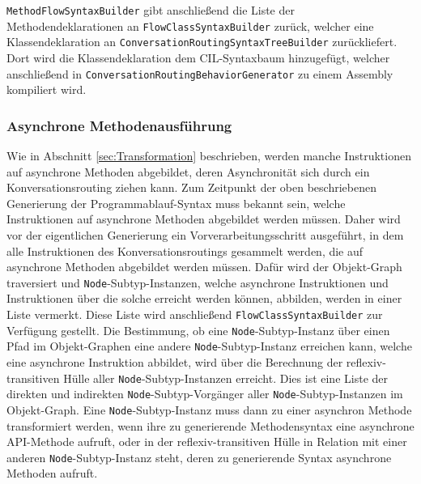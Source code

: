\newline
\texttt{Meth\-od\-Flow\-Syn\-tax\-Buil\-der} gibt anschließend die Liste der Methodendeklarationen an \texttt{Flow\-Class\-Syn\-tax\-Buil\-der} zurück, welcher eine Klassendeklaration an \texttt{Con\-ver\-sa\-tion\-Rou\-ting\-Syn\-tax\-Tree\-Buil\-der} zurückliefert. Dort wird die Klassendeklaration dem CIL-Syntaxbaum hinzugefügt, welcher anschließend in  \texttt{Con\-ver\-sa\-tion\-Rou\-ting\-Be\-ha\-vior\-Gen\-era\-tor} zu einem Assembly kompiliert wird.

\subsubsection{Asynchrone Methodenausführung}
\label{subsubsec:Nebenlaeufigkeit}
Wie in Abschnitt \ref{sec:Transformation} beschrieben, werden manche Instruktionen auf asynchrone Methoden abgebildet, deren Asynchronität sich durch ein Konversationsrouting ziehen kann. Zum Zeitpunkt der oben beschriebenen Generierung der Pro\-gramm\-ab\-lauf-Syntax muss bekannt sein, welche Instruktionen auf asynchrone Methoden abgebildet werden müssen. Daher wird vor der eigentlichen Generierung ein Vorverarbeitungsschritt ausgeführt, in dem alle Instruktionen des Konversationsroutings gesammelt werden, die auf asynchrone Methoden abgebildet werden müssen. Dafür wird der Objekt-Graph traversiert und \texttt{Node}-Subtyp-Instanzen, welche asynchrone Instruktionen und Instruktionen über die solche erreicht werden können, abbilden, werden in einer Liste vermerkt. Diese Liste wird anschließend \texttt{FlowClassSyntaxBuilder} zur Verfügung gestellt. Die Bestimmung, ob eine \texttt{Node}-Subtyp-Instanz über einen Pfad im Objekt-Graphen eine andere \texttt{Node}-Subtyp-Instanz erreichen kann, welche eine asynchrone Instruktion abbildet, wird über die Berechnung der reflexiv-transitiven Hülle aller \texttt{Node}-Subtyp-Instanzen erreicht. Dies ist eine Liste der direkten und indirekten \texttt{Node}-Subtyp-Vorgänger aller \texttt{Node}-Subtyp-Instanzen im Objekt-Graph. Eine \texttt{Node}-Subtyp-Instanz muss dann zu einer asynchron Methode transformiert werden, wenn ihre zu generierende Methodensyntax eine asynchrone API-Methode aufruft, oder in der reflexiv-transitiven Hülle in Relation mit einer anderen \texttt{Node}-Subtyp-Instanz steht, deren zu generierende Syntax asynchrone Methoden aufruft.

